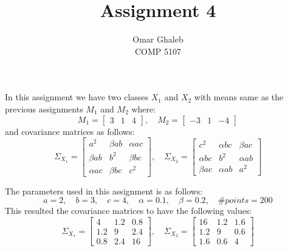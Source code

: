 \documentclass[11pt, oneside]{article}   	%
\title{Assignment 4}
\author{Omar Ghaleb\\
COMP 5107}
\date{}							%
\begin{document}
\renewcommand\thesubsection{\alph{subsection}.}
\maketitle
In this assignment we have two classes $X_1$ and $X_2$ with means same as the previous assignments $M_1$ and $M_2$ where: $$M_1 = \begin{bmatrix}
3 & 1 & 4 
\end{bmatrix},\quad M_2 = \begin{bmatrix}
-3 & 1 & -4 
\end{bmatrix}$$
  and covariance matrices as follows: 
  $$\Sigma_{X_1} = \begin{bmatrix}
a^2 & \beta ab & \alpha ac \\
\beta ab & b^2 & \beta bc \\
\alpha ac & \beta bc & c^2 
\end{bmatrix},\quad \Sigma_{X_2} = \begin{bmatrix}
c^2 & \alpha bc & \beta ac \\
\alpha bc & b^2 & \alpha ab \\
\beta ac & \alpha ab & a^2 
\end{bmatrix}$$

The parameters used in this assignment is as follows:
$$ a=2,\quad b=3,\quad c=4,\quad \alpha=0.1,\quad \beta=0.2,\quad \#points = 200 $$
This resulted the covariance matrices to have the following values:
$$\Sigma_{X_1} = \begin{bmatrix}
4 & 1.2 & 0.8 \\
1.2 & 9 & 2.4 \\
0.8 & 2.4 & 16 
\end{bmatrix}, \quad \Sigma_{X_2} = \begin{bmatrix}
16 & 1.2 & 1.6 \\
1.2 & 9 & 0.6 \\
1.6 & 0.6 & 4 
\end{bmatrix}$$


\end{document}
